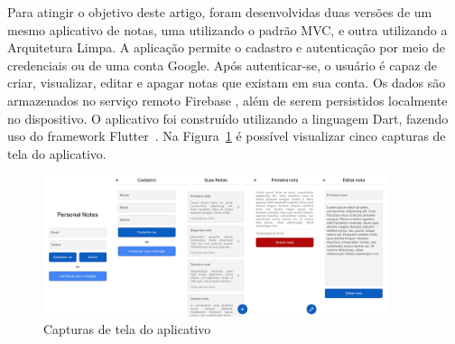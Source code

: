 Para atingir o objetivo deste artigo, foram desenvolvidas duas versões de um mesmo aplicativo de notas, uma utilizando o padrão MVC, e outra utilizando a Arquitetura Limpa.
A aplicação permite o cadastro e autenticação por meio de credenciais ou de uma conta Google.
Após autenticar-se, o usuário é capaz de criar, visualizar, editar e apagar notas que existam em sua conta.
Os dados são armazenados no serviço remoto Firebase \cite{firebase}, além de serem persistidos localmente no dispositivo.
O aplicativo foi construído utilizando a linguagem Dart, fazendo uso do framework Flutter~\cite{flutter}.
Na Figura~\ref{fig:screenshots} é possível visualizar cinco capturas de tela do aplicativo.

\begin{figure}[ht]
	\centering
	\includegraphics[width=0.9\textwidth]{images/screenshots.png}
	\caption{Capturas de tela do aplicativo}
	\label{fig:screenshots}
\end{figure}